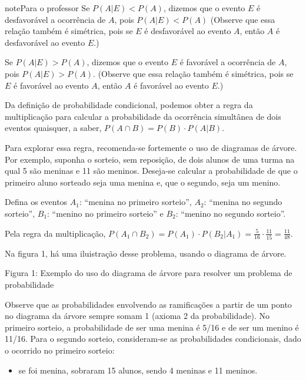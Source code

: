\begin{sphinxadmonition}{note}{Para o professor}
Se \(P(A| E )<P(A)\), dizemos que o evento \(E\) é desfavorável a ocorrência de \(A\), pois \(P(A| E)<P(A)\) (Observe que essa relação também é simétrica, pois se \(E\) é desfavorável ao evento \(A\), então \(A\) é desfavorável ao evento \(E\).)

Se \(P(A| E)>P(A)\), dizemos que o evento \(E\) é favorável a ocorrência de \(A\), pois \(P(A|E)>P(A)\). (Observe que essa relação também é simétrica, pois se \(E\) é favorável ao evento \(A\), então \(A\) é favorável ao evento \(E\).)

Da definição de probabilidade condicional, podemos obter a regra da multiplicação para calcular a probabilidade da ocorrência simultânea de dois eventos quaisquer, a saber,  \(P(A\cap B)=P(B)\cdot P(A|B)\).

Para explorar essa regra, recomenda-se fortemente o uso de diagramas de árvore. Por exemplo, suponha o sorteio, sem reposição, de dois alunos de uma turma na qual 5 são meninas e 11 são meninos.  Deseja-se calcular a probabilidade de que o primeiro aluno sorteado seja uma menina e, que o segundo, seja um menino.

Defina os eventos \(A_1\): “menina no primeiro sorteio”, \(A_2\): “menina no segundo sorteio”, \(B_1\): “menino no primeiro sorteio” e \(B_2\): “menino no segundo sorteio”.

Pela regra da multiplicação, \(P(A_1\cap B_2)=P(A_1)\cdot P(B_2|A_1)=\frac{5}{16}\cdot \frac{11}{15}=\frac{11}{48}\).

Na figura 1, há uma iluistração desse problema, usando o diagrama de árvore.
\label{\detokenize{PE511-6:fig-coloque-aqui-o-nome}}
\begin{figure}[H]
\centering

\noindent{}
\label{\detokenize{PE511-6:fig-coloque-aqui-o-nome}}\end{figure}

Figura 1: Exemplo do uso do diagrama de árvore para resolver um problema de probabilidade

Observe que as probabilidades envolvendo as ramificações a partir de um ponto no diagrama da árvore sempre somam 1 (axioma 2 da probabilidade). No primeiro sorteio, a probabilidade de ser uma menina é 5/16 e de ser um menino é 11/16. Para o segundo sorteio, consideram-se as probabilidades condicionais, dado o ocorrido no primeiro sorteio:
\begin{itemize}
\item {} 
se foi menina, sobraram 15 alunos, sendo 4 meninas e 11 meninos.


\end{itemize}
\end{sphinxadmonition}
